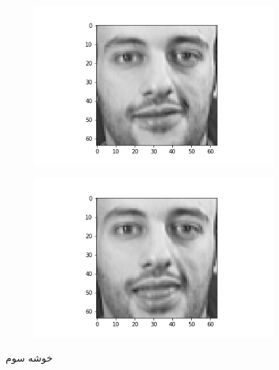 \documentclass[12pt, a4paper]{article}
\begin{document}
\begin{figure}[h]
    \begin{subfigure}{0.3\linewidth}
        \centering
        \includegraphics[width=\linewidth]{images/q3/c/2/0.png}
    \end{subfigure}
    \hfill
    \begin{subfigure}{0.3\linewidth}
        \centering
        \includegraphics[width=\linewidth]{images/q3/c/2/1.png}
    \end{subfigure}
    \hfill
    \caption{خوشه سوم}
\end{figure}

\clearpage
\end{document}
